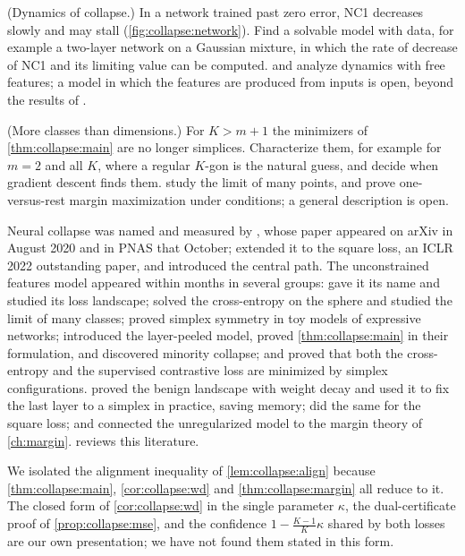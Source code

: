 \begin{refsection}
\begin{exercises}
\item \research (Dynamics of collapse.) In a network trained past zero error, NC1 decreases slowly and may stall (\cref{fig:collapse:network}). Find a solvable model with data, for example a two-layer network on a Gaussian mixture, in which the rate of decrease of NC1 and its limiting value can be computed. \Textcite{HanPapyanDonoho2022} and \textcite{JiEtAl2022} analyze dynamics with free features; a model in which the features are produced from inputs is open, beyond the results of \textcite{JacotEtAl2025}. \label{ex:collapse:dynamics}

\item \research (More classes than dimensions.) For $K>m+1$ the minimizers of \cref{thm:collapse:main} are no longer simplices. Characterize them, for example for $m=2$ and all $K$, where a regular $K$-gon is the natural guess, and decide when gradient descent finds them. \Textcite{LuSteinerberger2022} study the limit of many points, and \textcite{JiangEtAl2024} prove one-versus-rest margin maximization under conditions; a general description is open. \label{ex:collapse:many}
\end{exercises}

\notesandrefs
Neural collapse was named and measured by \textcite{PapyanHanDonoho2020}, whose paper appeared on arXiv in August 2020 and in PNAS that October; \textcite{HanPapyanDonoho2022} extended it to the square loss, an ICLR 2022 outstanding paper, and introduced the central path. The unconstrained features model appeared within months in several groups: \textcite{MixonParshallPi2020} gave it its name and studied its loss landscape; \textcite{LuSteinerberger2022} solved the cross-entropy on the sphere and studied the limit of many classes; \textcite{EWojtowytsch2022} proved simplex symmetry in toy models of expressive networks; \textcite{FangEtAl2021} introduced the layer-peeled model, proved \cref{thm:collapse:main} in their formulation, and discovered minority collapse; and \textcite{GrafEtAl2021} proved that both the cross-entropy and the supervised contrastive loss are minimized by simplex configurations. \Textcite{ZhuEtAl2021} proved the benign landscape with weight decay and used it to fix the last layer to a simplex in practice, saving memory; \textcite{ZhouEtAl2022} did the same for the square loss; and \textcite{JiEtAl2022} connected the unregularized model to the margin theory of \cref{ch:margin}. \Textcite{Kothapalli2023} reviews this literature.

We isolated the alignment inequality of \cref{lem:collapse:align} because \cref{thm:collapse:main}, \cref{cor:collapse:wd} and \cref{thm:collapse:margin} all reduce to it. The closed form of \cref{cor:collapse:wd} in the single parameter $\kappa$, the dual-certificate proof of \cref{prop:collapse:mse}, and the confidence $1-\frac{K-1}K\kappa$ shared by both losses are our own presentation; we have not found them stated in this form.


\end{refsection}
